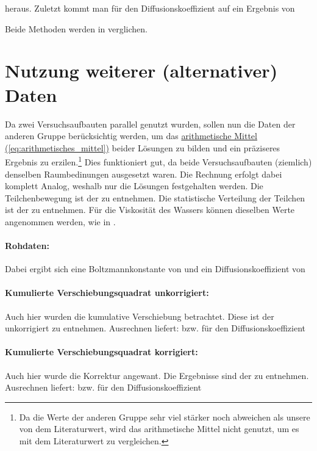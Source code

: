 heraus. Zuletzt kommt man für den Diffusionskoeffizient auf ein Ergebnis von


Beide Methoden werden in  verglichen.

\section{Nutzung weiterer (alternativer) Daten}
\label{sec:alt_data}
Da zwei Versuchsaufbauten parallel genutzt wurden, sollen nun die Daten der anderen Gruppe berücksichtig werden, um das \hyperref[eq:arithmetisches_mittel]{arithmetische Mittel (\ref*{eq:arithmetisches_mittel})} beider Lösungen zu bilden und ein präziseres Ergebnis zu erzilen.\footnote{Da die Werte der anderen Gruppe sehr viel stärker noch abweichen als unsere von dem Literaturwert, wird das arithmetische Mittel nicht genutzt, um es mit dem Literaturwert zu vergleichen.}
Dies funktioniert gut, da beide Versuchsaufbauten (ziemlich) denselben Raumbedinungen ausgesetzt waren.
Die Rechnung erfolgt dabei komplett Analog, weshalb nur die Lösungen festgehalten werden. Die Teilchenbewegung ist der  zu entnehmen.
Die statistische Verteilung der Teilchen ist der  zu entnehmen.
Für die Viskosität des Wassers können dieselben Werte angenommen werden, wie in .

\paragraph{Rohdaten:}
Dabei ergibt sich eine Boltzmannkonstante von
und ein Diffusionskoeffizient von

\paragraph{Kumulierte Verschiebungsquadrat unkorrigiert:}
Auch hier wurden die kumulative Verschiebung betrachtet. Diese ist der  unkorrigiert zu entnehmen.
Ausrechnen liefert:
bzw. für den Diffusionskoeffizient


\paragraph{Kumulierte Verschiebungsquadrat korrigiert:}
Auch hier wurde die Korrektur angewant. Die Ergebnisse sind der  zu entnehmen.
Ausrechnen liefert:
bzw. für den Diffusionskoeffizient


